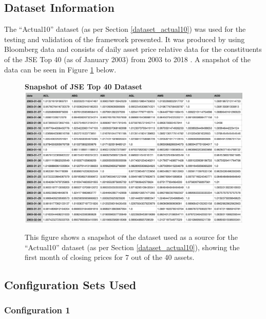 \documentclass[a4paper,11pt,oneside]{article}
\theoremstyle{plain}
\theoremstyle{definition}
\begin{document}
	\newpage
	\subsection{Dataset Information}\label{appendix_dataset}
	
	The ``Actual10'' dataset (as per Section \ref{dataset_actual10}) was used for the testing and validation of the framework presented. It was produced by \citet{Gant} using Bloomberg data and consists of daily asset price relative data for the constituents of the JSE Top 40 (as of January 2003) from 2003 to 2018 \citep{JSEData}. A snapshot of the data can be seen in Figure \ref{figure-dataset_snapshot} below. \newline
	
	\begin{figure}[H]
		\centering 
		\textbf{Snapshot of JSE Top 40 Dataset}
		\includegraphics[scale=0.5]{images/data/dataset_snapshot.png}
		\caption[Snapshot of JSE Top 40 Dataset]{This figure shows a snapshot of the dataset used as a source for the  ``Actual10'' dataset (as per Section \ref{dataset_actual10}), showing the first month of closing prices for 7 out of the 40 assets.}
		\label{figure-dataset_snapshot}
	\end{figure}
	
	\newpage
	\subsection{Configuration Sets Used}\label{appendix_configs}
	
	\subsubsection{Configuration 1}\label{config1}
	
\end{document}

